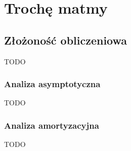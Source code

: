 \chapter{Trochę matmy}

\section{Złożoność obliczeniowa}


TODO

\subsection{Analiza asymptotyczna}


TODO

\subsection{Analiza amortyzacyjna}


TODO

